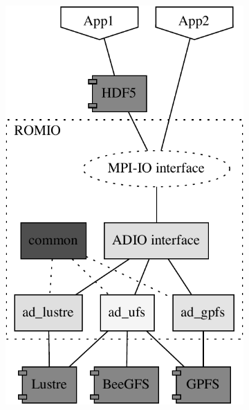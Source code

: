 \begin{figure}[!htb]
  \centering
  \begin{subfigure}[t]{0.38\textwidth}
  \includegraphics[width=\textwidth]{figures/romio-architecture-baw.pdf}
  \caption{}
  \label{figure: romio-architecture}
  \end{subfigure}
  \begin{subfigure}[t]{0.55\textwidth}

\end{subfigure}
\end{figure}
